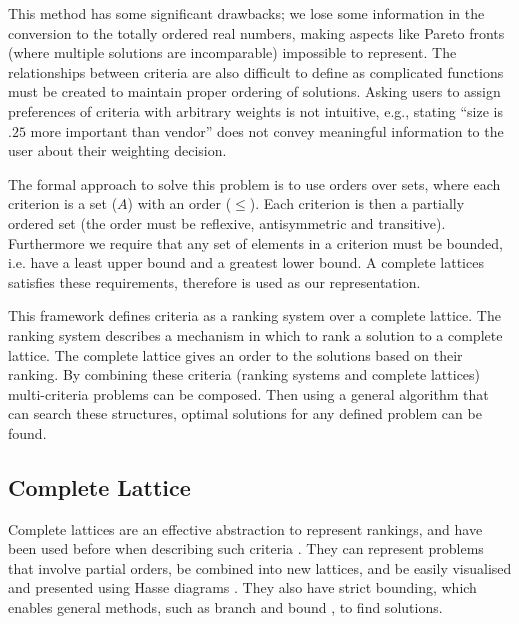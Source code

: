 This method has some significant drawbacks;
we lose some information in the conversion to the totally ordered real numbers,
making aspects like Pareto fronts \cite{pareto1964cours} (where multiple solutions are incomparable) impossible to represent.
The relationships between criteria are also difficult to define 
as complicated functions must be created to maintain proper ordering of solutions.
Asking users to assign preferences of criteria with arbitrary weights is not intuitive,
e.g., stating ``size is $.25$ more important than vendor'' does not convey meaningful information to the user about their weighting decision.

The formal approach to solve this problem is to use orders over sets, 
where each criterion is a set ($A$) with an order ($\leq$).
Each criterion is then a partially ordered set (the order must be reflexive, antisymmetric and transitive).
Furthermore we require that any set of elements in a criterion must be bounded, 
i.e. have a least upper bound and a greatest lower bound.
A complete lattices satisfies these requirements, therefore is used as our representation. 


This framework defines criteria as a ranking system over a complete lattice.
The ranking system describes a mechanism in which to rank a solution to a complete lattice. 
The complete lattice gives an order to the solutions based on their ranking.
By combining these criteria (ranking systems and complete lattices) multi-criteria problems can be composed.
Then using a general algorithm that can search these structures, 
optimal solutions for any defined problem can be found.

\subsection{Complete Lattice}
Complete lattices are an effective abstraction to represent rankings,
and have been used before when describing such criteria \cite{Bistarelli1997,Fernandez}.
They can represent problems that involve partial orders,
be combined into new lattices,
and be easily visualised and presented using Hasse diagrams \cite{davey1990introduction}.
They also have strict bounding, which enables general methods, such as branch and bound \cite{Land1960}, to find solutions.

